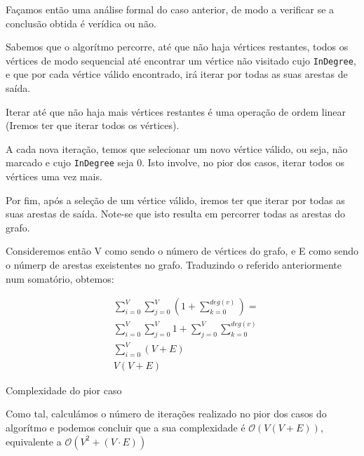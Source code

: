 Façamos então uma análise formal do caso anterior, de modo a
verificar se a conclusão obtida é verídica ou não.


Sabemos que o algorítmo percorre, até que não haja vértices
restantes, todos os vértices de modo
sequencial até encontrar um vértice não visitado cujo
\verb|InDegree|, e que por cada vértice válido encontrado, irá
iterar por todas as suas arestas de saída.

Iterar até que não haja mais vértices restantes é uma operação de
ordem linear (Iremos ter que iterar todos os vértices).

A cada nova iteração, temos que selecionar um novo vértice
válido, ou seja, não marcado e cujo \verb|InDegree| seja 0. Isto
involve, no pior dos casos, iterar todos os vértices uma vez
mais.

Por fim, após a seleção de um vértice válido, iremos ter que
iterar por todas as suas arestas de saída. Note-se que isto
resulta em percorrer todas as arestas do grafo.

Consideremos então V como sendo o número de vértices do grafo, e
E como sendo o númerp de arestas exeistentes no grafo. Traduzindo o referido anteriormente num somatório, obtemos:

\begin{listing}[H]
	\begin{align}
		 & \sum_{i = 0}^{V} \sum_{j=0}^{V} (1 + \sum_{k=0}^{deg(v)}) =
		\\
		 & \sum_{i = 0}^{V} \sum_{j=0}^{V} 1 + \sum_{j=0}^{V}
		\sum_{k=0}^{deg(v)}                                            \\
		 & \sum_{i=0}^{V} (V + E)                                      \\
		 & V(V+E)
	\end{align}
	\caption{Complexidade do pior caso}
\end{listing}

Como tal, calculámos o número de iterações realizado no pior dos
casos do algorítmo e podemos concluir que a sua complexidade é
$\mathcal{O}(V(V+E))$, equivalente a $\mathcal{O}(V^2+(V \cdot
	E))$
